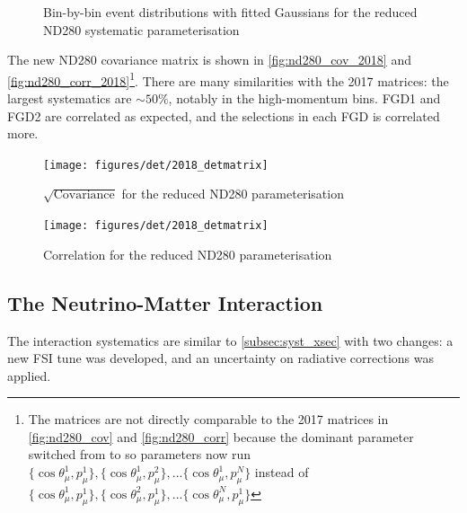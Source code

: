 \begin{figure}[h]
\begin{subfigure}[t]{0.32\textwidth}
	\end{subfigure}
	\caption{Bin-by-bin event distributions with fitted Gaussians for the reduced ND280 systematic parameterisation}
	\label{fig:det_binbybin}
\end{figure}

The new ND280 covariance matrix is shown in \autoref{fig:nd280_cov_2018} and \autoref{fig:nd280_corr_2018}\footnote{The matrices are not directly comparable to the 2017 matrices in \autoref{fig:nd280_cov} and \autoref{fig:nd280_corr} because the dominant parameter switched from \pmu to \cosmu so parameters now run $\{\cos\theta_\mu^1,p_\mu^1\}, \{\cos\theta_\mu^1,p_\mu^2\},...\{\cos\theta_\mu^1,p_\mu^N\}$ instead of $\{\cos\theta_\mu^1,p_\mu^1\}, \{\cos\theta_\mu^2,p_\mu^1\},...\{\cos\theta_\mu^N,p_\mu^1\}$}. There are many similarities with the 2017 matrices: the largest systematics are $\sim50\%$, notably in the high-momentum bins. FGD1 and FGD2 are correlated as expected, and the selections in each FGD is correlated more.
\begin{figure}[h]
	\texttt{[image: figures/det/2018\_detmatrix]}
	\caption{$\sqrt{\text{Covariance}}$ for the reduced ND280 parameterisation}
	\label{fig:nd280_cov_2018}
\end{figure}

\begin{figure}[h]
	\texttt{[image: figures/det/2018\_detmatrix]}
	\caption{Correlation for the reduced ND280 parameterisation}
	\label{fig:nd280_corr_2018}
\end{figure}

\subsection{The Neutrino-Matter Interaction}
The interaction systematics are similar to \autoref{subsec:syst_xsec} with two changes: a new FSI tune was developed, and an uncertainty on radiative corrections was applied.

